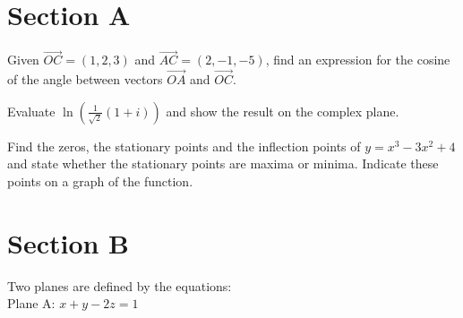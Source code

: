 \documentclass[11pt]{exam}
\begin{document}
\section*{Section A}\label{sa}
\begin{questions}

\addpoints
\question[2] Given $\vec{OC} = (1,2,3)$ and $\vec{AC} = (2,−1,−5)$, find an expression for the cosine of the angle between vectors $\vec{OA}$ and $\vec{OC}$.

\addpoints
\question[4]Evaluate $\ln(\frac{1}{\sqrt{2}} (1+i))$ and show the result on the complex plane.


\addpoints
\question
{}

\addpoints
\question[6] Find the zeros, the stationary points and the inflection points of $y = x^{3} - 3 x^{2} + 4$
and state whether the stationary points are maxima or minima. Indicate these points on a graph of the function.



\addpoints
\question
{}



\section*{Section B}\label{sb}
\addpoints
\question Two planes are defined by the equations:\\
Plane A: $x+y-2z=1$\\


\end{questions}
\end{document}
